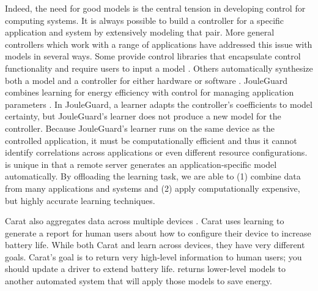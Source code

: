 Indeed, the need for good models is the central tension in developing
control for computing systems.  It is always possible to build a
controller for a specific application and system by extensively
modeling that pair.  More general controllers which work with a range
of applications have addressed this issue with models in several ways.
Some provide control libraries that encapsulate control functionality
and require users to input a model
\cite{ControlWare,Sojka,Rajkumar,POET}.  Others automatically
synthesize both a model and a controller for either hardware
\cite{josep-isca2016} or software \cite{ICSE2014,FSE2015}.  JouleGuard
combines learning for energy efficiency with control for managing
application parameters \cite{JouleGuard}.  In JouleGuard, a learner
adapts the controller's coefficients to model certainty, but
JouleGuard's learner does not produce a new model for the controller.
Because JouleGuard's learner runs on the same device as the controlled
application, it must be computationally efficient and thus it cannot
identify correlations across applications or even different resource
configurations.  \SYSTEM{} is unique in that a remote server generates
an application-specific model automatically.  By offloading the
learning task, we are able to (1) combine data from many applications
and systems and (2) apply computationally expensive, but highly
accurate learning techniques. 

Carat also aggregates data across multiple devices \cite{carat}.
Carat uses learning to generate a report for human users about how to
configure their device to increase battery life.  While both Carat and
\SYSTEM{} learn across devices, they have very different goals.
Carat's goal is to return very high-level information to human users;
\eg{} you should update a driver to extend battery life.  \SYSTEM{}
returns lower-level models to another automated system that will apply
those models to save energy.

